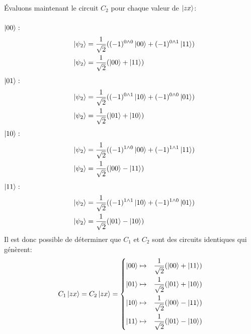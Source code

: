 \documentclass{article}
\begin{document}
Évaluons maintenant le circuit $C_2$ pour chaque valeur de $\ket{zx}$: \\ \\
$\ket{00}:$ \\
\begin{align*}
&&      \ket{\psi_2} &= \frac{1}{\sqrt{2}}((-1)^{0 \wedge 0}\ket{00} + (-1)^{0 \wedge 1}\ket{11}) \\
&&      \ket{\psi_2} &= \frac{1}{\sqrt{2}}(\ket{00} + \ket{11})\\
\end{align*}
$\ket{01}:$ \\
\begin{align*}
&&      \ket{\psi_2} &= \frac{1}{\sqrt{2}}((-1)^{0 \wedge 1}\ket{10} + (-1)^{0 \wedge 0}\ket{01}) \\
&&      \ket{\psi_2} &= \frac{1}{\sqrt{2}}(\ket{01} + \ket{10})\\
\end{align*}
$\ket{10}:$ \\
\begin{align*}
&&      \ket{\psi_2} &= \frac{1}{\sqrt{2}}((-1)^{1 \wedge 0}\ket{00} + (-1)^{1 \wedge 1}\ket{11}) \\
&&      \ket{\psi_2} &= \frac{1}{\sqrt{2}}(\ket{00} - \ket{11})\\
\end{align*}
$\ket{11}:$ \\
\begin{align*}
&&      \ket{\psi_2} &= \frac{1}{\sqrt{2}}((-1)^{1 \wedge 1}\ket{10} + (-1)^{1 \wedge 0}\ket{01}) \\
&&      \ket{\psi_2} &= \frac{1}{\sqrt{2}}(\ket{01} - \ket{10})\\
\end{align*}
Il est donc possible de déterminer que $C_1$ et $C_2$ sont des circuits identiques qui génèrent: \\
\[
C_1\ket{zx} = C_2\ket{zx} =
    \left\{
        \begin{aligned}
           \ket{00} \mapsto&\quad \frac{1}{\sqrt{2}}(\ket{00} + \ket{11}) \\
           \ket{01} \mapsto&\quad \frac{1}{\sqrt{2}}(\ket{01} + \ket{10}) \\
           \ket{10} \mapsto&\quad \frac{1}{\sqrt{2}}(\ket{00} - \ket{11}) \\
           \ket{11} \mapsto&\quad \frac{1}{\sqrt{2}}(\ket{01} - \ket{10}) \\
        \end{aligned}
    \right .
\] \\
\end{document}
